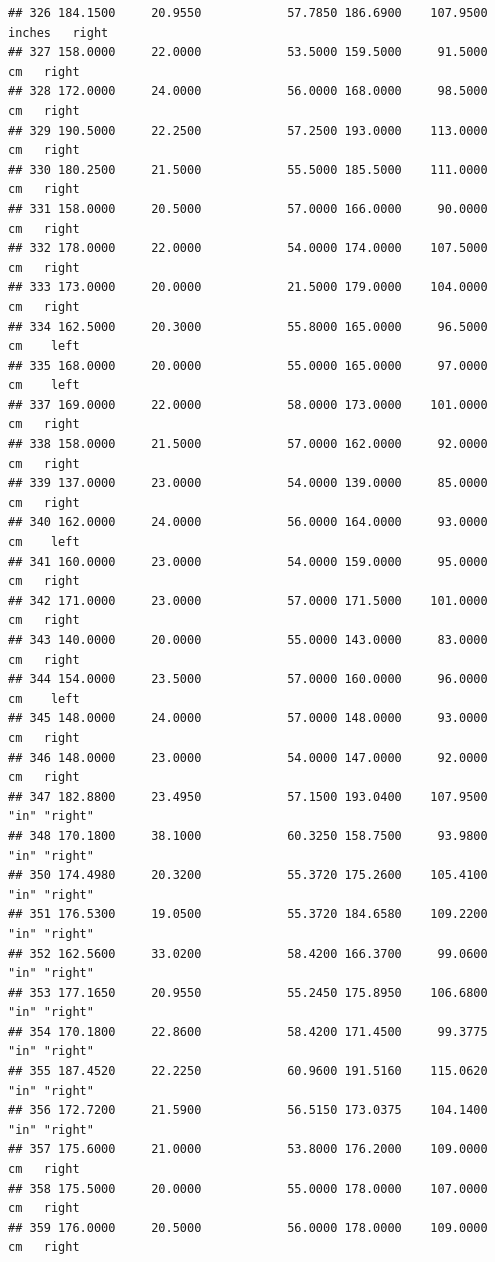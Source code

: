\documentclass[]{article}
\begin{document}
\begin{verbatim}
## 326 184.1500     20.9550            57.7850 186.6900    107.9500 inches   right
## 327 158.0000     22.0000            53.5000 159.5000     91.5000     cm   right
## 328 172.0000     24.0000            56.0000 168.0000     98.5000     cm   right
## 329 190.5000     22.2500            57.2500 193.0000    113.0000     cm   right
## 330 180.2500     21.5000            55.5000 185.5000    111.0000     cm   right
## 331 158.0000     20.5000            57.0000 166.0000     90.0000     cm   right
## 332 178.0000     22.0000            54.0000 174.0000    107.5000     cm   right
## 333 173.0000     20.0000            21.5000 179.0000    104.0000     cm   right
## 334 162.5000     20.3000            55.8000 165.0000     96.5000     cm    left
## 335 168.0000     20.0000            55.0000 165.0000     97.0000     cm    left
## 337 169.0000     22.0000            58.0000 173.0000    101.0000     cm   right
## 338 158.0000     21.5000            57.0000 162.0000     92.0000     cm   right
## 339 137.0000     23.0000            54.0000 139.0000     85.0000     cm   right
## 340 162.0000     24.0000            56.0000 164.0000     93.0000     cm    left
## 341 160.0000     23.0000            54.0000 159.0000     95.0000     cm   right
## 342 171.0000     23.0000            57.0000 171.5000    101.0000     cm   right
## 343 140.0000     20.0000            55.0000 143.0000     83.0000     cm   right
## 344 154.0000     23.5000            57.0000 160.0000     96.0000     cm    left
## 345 148.0000     24.0000            57.0000 148.0000     93.0000     cm   right
## 346 148.0000     23.0000            54.0000 147.0000     92.0000     cm   right
## 347 182.8800     23.4950            57.1500 193.0400    107.9500   "in" "right"
## 348 170.1800     38.1000            60.3250 158.7500     93.9800   "in" "right"
## 350 174.4980     20.3200            55.3720 175.2600    105.4100   "in" "right"
## 351 176.5300     19.0500            55.3720 184.6580    109.2200   "in" "right"
## 352 162.5600     33.0200            58.4200 166.3700     99.0600   "in" "right"
## 353 177.1650     20.9550            55.2450 175.8950    106.6800   "in" "right"
## 354 170.1800     22.8600            58.4200 171.4500     99.3775   "in" "right"
## 355 187.4520     22.2250            60.9600 191.5160    115.0620   "in" "right"
## 356 172.7200     21.5900            56.5150 173.0375    104.1400   "in" "right"
## 357 175.6000     21.0000            53.8000 176.2000    109.0000     cm   right
## 358 175.5000     20.0000            55.0000 178.0000    107.0000     cm   right
## 359 176.0000     20.5000            56.0000 178.0000    109.0000     cm   right

\end{verbatim}
\end{document}
